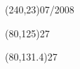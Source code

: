 \documentclass[landscape]{scrartcl}
\begin{document}
\begin{textblock}{2}(240,23)07/2008\end{textblock}
\begin{textblock}{2}(80,125)27\end{textblock}
\begin{textblock}{2}(80,131.4)27\end{textblock}


\end{document}
